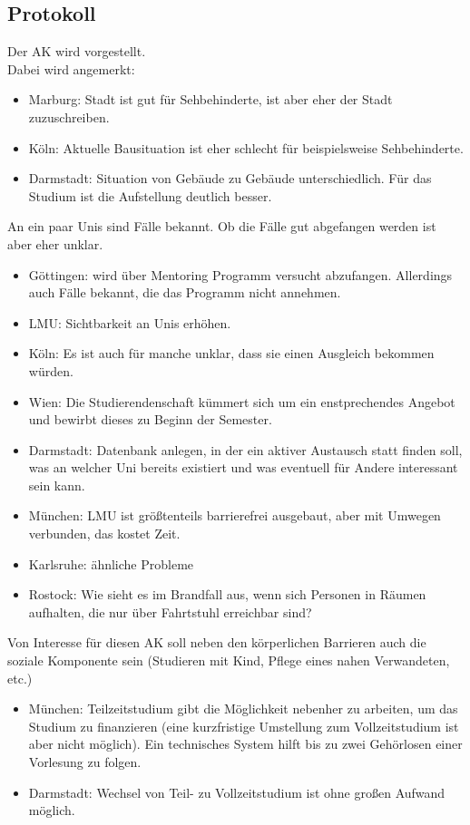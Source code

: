   \subsection*{Protokoll}
    Der AK wird vorgestellt. \\
    Dabei wird angemerkt:
    \begin{itemize}
      \item Marburg: Stadt ist gut für Sehbehinderte, ist aber eher der Stadt zuzuschreiben.
      \item Köln: Aktuelle Bausituation ist eher schlecht für beispielsweise Sehbehinderte.
      \item Darmstadt: Situation von Gebäude zu Gebäude unterschiedlich. Für das Studium ist die Aufstellung deutlich besser.
    \end{itemize}

    An ein paar Unis sind Fälle bekannt. Ob die Fälle gut abgefangen werden ist aber eher unklar.
    \begin{itemize}
      \item Göttingen: wird über Mentoring Programm versucht abzufangen. Allerdings auch Fälle bekannt, die das Programm nicht annehmen.
      \item LMU: Sichtbarkeit an Unis erhöhen.
      \item Köln: Es ist auch für manche unklar, dass sie einen Ausgleich bekommen würden.
      \item Wien: Die Studierendenschaft kümmert sich um ein enstprechendes Angebot und bewirbt dieses zu Beginn der Semester.
      \item Darmstadt: Datenbank anlegen, in der ein aktiver Austausch statt finden soll, was an welcher Uni bereits existiert und was eventuell für Andere interessant sein kann.
      \item München: LMU ist größtenteils barrierefrei ausgebaut, aber mit Umwegen verbunden, das kostet Zeit.
      \item Karlsruhe: ähnliche Probleme
      \item Rostock: Wie sieht es im Brandfall aus, wenn sich Personen in Räumen aufhalten, die nur über Fahrtstuhl erreichbar sind?
    \end{itemize}

    Von Interesse für diesen AK soll neben den körperlichen Barrieren auch die soziale Komponente sein (Studieren mit Kind, Pflege eines nahen Verwandeten, etc.)
    \begin{itemize}
      \item München: Teilzeitstudium gibt die Möglichkeit nebenher zu arbeiten, um das Studium zu finanzieren (eine kurzfristige Umstellung zum Vollzeitstudium ist aber nicht möglich). Ein technisches System hilft bis zu zwei Gehörlosen einer Vorlesung zu folgen.
      \item Darmstadt: Wechsel von Teil- zu Vollzeitstudium ist ohne großen Aufwand möglich.
    \end{itemize}

